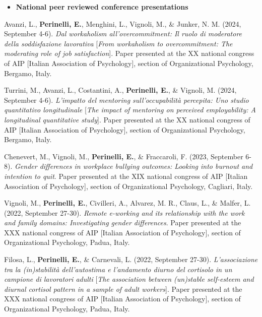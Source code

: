 \documentclass[hidelinks, letterpaper,10pt]{article} %
\begin{document}
\begin{itemize} 
	\setlength{\topsep}{0pt}%
	\setlength{\leftmargin}{0.1in}%
	\setlength{\listparindent}{-0.1in}%
	\setlength{\itemindent}{-0.2in}%
	\setlength{\parsep}{\parskip}%
	
	\item {\textbf{\large{National peer reviewed conference presentations}}}
\end{itemize}
\begin{etaremune}
	

	\item Avanzi, L., \textbf{Perinelli, E.}, Menghini, L., Vignoli, M., \& Junker, N. M. (2024, September 4-6). \textit{Dal workaholism all’overcommitment: Il ruolo di moderatore della soddisfazione lavorativa} [\textit{From workaholism to overcommitment: The moderating role of job satisfaction}]. Paper presented at the XX national congress of AIP [Italian Association of Psychology], section of Organizational Psychology, Bergamo, Italy.

	\item Turrini, M., Avanzi, L., Costantini, A., \textbf{Perinelli, E.}, \& Vignoli, M. (2024, September 4-6). \textit{L'impatto del mentoring sull'occupabilità percepita: Uno studio quantitativo longitudinale} [\textit{The impact of mentoring on perceived employability: A longitudinal quantitative study}]. Paper presented at the XX national congress of AIP [Italian Association of Psychology], section of Organizational Psychology, Bergamo, Italy.

	\item Chenevert, M., Vignoli, M., \textbf{Perinelli, E.}, \& Fraccaroli, F. (2023, September 6-8). \textit{Gender differences in workplace bullying outcomes: Looking into burnout and intention to quit}. Paper presented at the XIX national congress of AIP [Italian Association of Psychology], section of Organizational Psychology, Cagliari, Italy.

	\item Vignoli, M., \textbf{Perinelli, E.}, Civilleri, A., Alvarez, M. R., Claus, L., \& Malfer, L. (2022, September 27-30). \textit{Remote e-working and its relationship with the work and family domains: Investigating gender differences}. Paper presented at the XXX national congress of AIP [Italian Association of Psychology], section of Organizational Psychology, Padua, Italy.

	\item Filosa, L., \textbf{Perinelli, E.}, \& Carnevali, L. (2022, September 27-30). \textit{L'associazione tra la (in)stabilità dell'autostima e l'andamento diurno del cortisolo in un campione di lavoratori adulti} [\textit{The association between (un)stable self-esteem and diurnal cortisol pattern in a sample of adult workers}]. Paper presented at the XXX national congress of AIP [Italian Association of Psychology], section of Organizational Psychology, Padua, Italy.
	

\end{etaremune}
\end{document}
